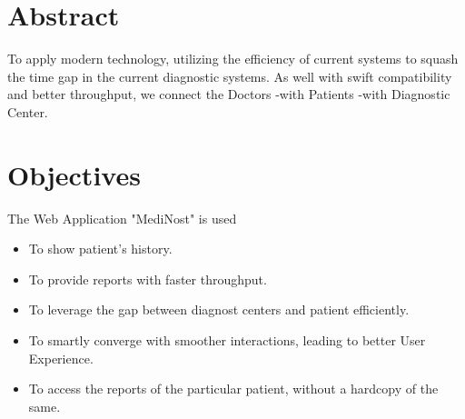 \documentclass{article}
\begin{document}
\thispagestyle{empty}
\newpage
\tableofcontents{}
\thispagestyle{empty}
\newpage
{}
\begin{center}
\section*{Abstract}
\begin{flushleft}
\justifying
To apply modern technology, utilizing the efficiency of current systems to squash the time gap in the current diagnostic systems. As well with swift compatibility and better throughput, we connect the Doctors -with Patients -with Diagnostic Center. 
\end{flushleft}
    
\section*{Objectives}
\begin{flushleft}
    The Web Application "MediNost" is used  
         \begin{itemize}
        \item To show patient's history.
        \item To provide reports with faster throughput.
        \item To leverage the gap between diagnost centers and patient efficiently.
        \item To smartly converge with smoother interactions, leading to better User Experience.
        \item To access the reports of the particular patient, without a hardcopy of the same.
        \end{itemize}
\end{flushleft}

\end{center}
\newpage

\listoffigures
\end{document}

